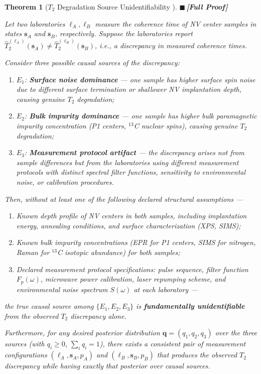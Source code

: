 \documentclass[11pt,a4paper]{article}
\newtheorem{theorem}{Theorem}[section]
\theoremstyle{definition}
\newcommand{\rigorFull}{{\color{rigorcolor}$\blacksquare$\,\textbf{[Full Proof]}}}
\newcommand{\Ttwo}{T_2}
\newcommand{\NV}{NV}
\begin{document}
\begin{theorem}[$\Ttwo$ Degradation Source Unidentifiability ]
\label{thm:unident}
\rigorFull

Let two laboratories $\ell_A, \ell_B$ measure the coherence time of \NV{}
center samples in states $\mathbf{s}_A$ and $\mathbf{s}_B$, respectively.
Suppose the laboratories report $\widehat{T}_2^{(\ell_A)}(\mathbf{s}_A) \neq \widehat{T}_2^{(\ell_B)}(\mathbf{s}_B)$,
i.e., a discrepancy in measured coherence times.

Consider three possible causal sources of the discrepancy:
\begin{enumerate}[label=(E\arabic*), nosep]
    \item $E_1$: \textbf{Surface noise dominance} — one sample has higher
    surface spin noise due to different surface termination or shallower
    \NV{} implantation depth, causing genuine $\Ttwo$ degradation;
    \item $E_2$: \textbf{Bulk impurity dominance} — one sample has higher
    bulk paramagnetic impurity concentration (P1 centers, ${}^{13}$C nuclear
    spins), causing genuine $\Ttwo$ degradation;
    \item $E_3$: \textbf{Measurement protocol artifact} — the discrepancy
    arises not from sample differences but from the laboratories using
    different measurement protocols with distinct spectral filter functions,
    sensitivity to environmental noise, or calibration procedures.
\end{enumerate}

Then, without at least one of the following declared structural assumptions —
\begin{enumerate}[label=(S\arabic*), nosep]
    \item Known depth profile of \NV{} centers in both samples, including
    implantation energy, annealing conditions, and surface characterization
    (XPS, SIMS);
    \item Known bulk impurity concentrations (EPR for P1 centers, SIMS for
    nitrogen, Raman for ${}^{13}$C isotopic abundance) for both samples;
    \item Declared measurement protocol specifications: pulse sequence,
    filter function $F_p(\omega)$, microwave power calibration, laser
    repumping scheme, and environmental noise spectrum $S(\omega)$ at
    each laboratory —
\end{enumerate}
the true causal source among $\{E_1, E_2, E_3\}$ is \textbf{fundamentally
unidentifiable} from the observed $\Ttwo$ discrepancy alone.

Furthermore, for any desired posterior distribution $\mathbf{q} = (q_1, q_2, q_3)$
over the three sources (with $q_i \geq 0$, $\sum_i q_i = 1$), there exists
a consistent pair of measurement configurations $(\ell_A, \mathbf{s}_A, p_A)$
and $(\ell_B, \mathbf{s}_B, p_B)$ that produces the observed $\Ttwo$
discrepancy while having exactly that posterior over causal sources.
\end{theorem}
\end{document}

